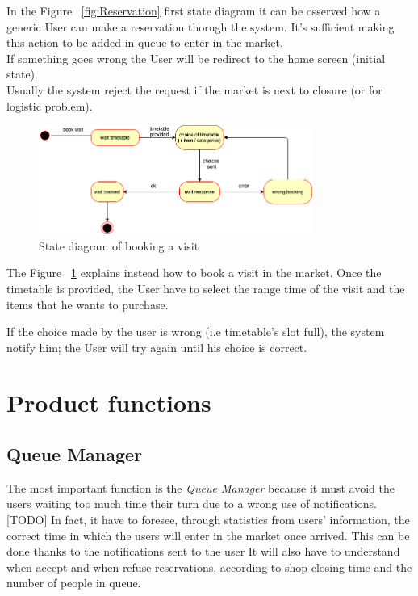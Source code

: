 In the Figure ~\ref{fig:Reservation} first state diagram it can be osserved how a generic User can make a reservation thorugh the system. It's sufficient making this action to be added in queue to enter in the market.
\\If something goes wrong the User will be redirect to the home screen (initial state).
\\Usually the system reject the request if the market is next to closure (or for logistic problem).

\par 
\medskip

\begin{figure}[h]
  \caption{State diagram of booking a visit}
  \label{fig:Visit}
  \centering
  \includegraphics[width=0.8\textwidth, height=0.4\textwidth]{diagrams/2-visit.png}
\end{figure}

\par 
\medskip

The Figure ~\ref{fig:Visit} explains instead how to book a visit in the market. Once the timetable is provided, the User have to select the range time of the visit and the items that he wants to purchase. \par If the choice made by the user is wrong (i.e timetable's slot full), the system notify him; the User will try again until his choice is correct.
\par 
\medskip


\section{Product functions}
\subsection{Queue Manager}
The most important function is the \textit{Queue Manager} because it must avoid the users waiting too much time their turn due to a wrong use of notifications. [TODO]
In fact, it have to foresee, through statistics from users’ information, the correct time in which the users will enter in the market once arrived. This can be done thanks to the notifications sent to the user 
It will also have to understand when accept and when refuse reservations, according to shop closing time and the number of people in queue. 
